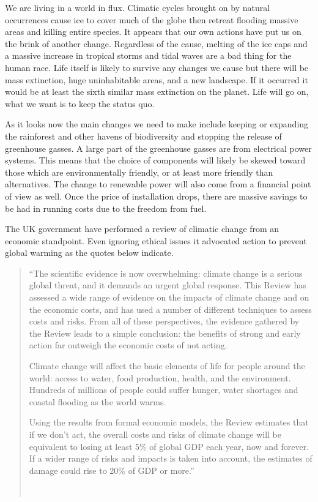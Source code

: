 \documentclass[a4paper,oneside,12pt]{report}
\newcommand{\tmpquotecite}{}%
\newenvironment{myquote}[1][]
{\renewcommand{\tmpquotecite}{#1}\begin{quote}\begin{itshape}``}
{''\end{itshape}~{\normalfont~\tmpquotecite}\end{quote}}
\begin{document}
We are living in a world in flux. Climatic cycles brought on by natural occurrences cause ice to cover much of the globe then retreat flooding massive areas and killing entire species. It appears that our own actions have put us on the brink of another change. Regardless of the cause, melting of the ice caps and a massive increase in tropical storms and tidal waves are a bad thing for the human race. Life itself is likely to survive any changes we cause but there will be mass extinction, huge uninhabitable areas, and a new landscape. If it occurred it would be at least the sixth similar mass extinction on the planet. Life will go on, what we want is to keep the status quo.

As it looks now the main changes we need to make include keeping or expanding the rainforest and other havens of biodiversity and stopping the release of greenhouse gasses. A large part of the greenhouse gasses are from electrical power systems. This means that the choice of components will likely be skewed toward those which are environmentally friendly, or at least more friendly than alternatives. The change to renewable power will also come from a financial point of view as well. Once the price of installation drops, there are massive savings to be had in running costs due to the freedom from fuel.

The UK government have performed a review of climatic change from an economic standpoint. Even ignoring ethical issues it advocated action to prevent global warming as the quotes below indicate.

\begin{myquote}[\cite{Stern2007}]The scientific evidence is now overwhelming: climate change is a serious global threat, and it demands an urgent global response. This Review has assessed a wide range of evidence on the impacts of climate change and on the economic costs, and has used a number of different techniques to assess costs and risks. From all of these perspectives, the evidence gathered by the Review leads to a simple conclusion: the benefits of strong and early action far outweigh the economic costs of not acting.

Climate change will affect the basic elements of life for people around the world: access to water, food production, health, and the environment. Hundreds of millions of people could suffer hunger, water shortages and coastal flooding as the world warms.

Using the results from formal economic models, the Review estimates that if we don't act, the overall costs and risks of climate change will be equivalent to losing at least 5\% of global GDP each year, now and forever. If a wider range of risks and impacts is taken into account, the estimates of damage could rise to 20\% of GDP or more.\end{myquote}
\end{document}
